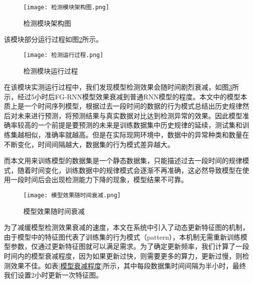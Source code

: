 \begin{figure}
  \centering
  \texttt{[image: 检测模块架构图.png]}
  \caption{检测模块架构图}
  \label{fig:检测模块架构图}
\end{figure}

  

该模块部分运行过程如图\ref{fig:检测模块运行过程}所示。

\begin{figure}
  \centering
  \texttt{[image: 检测运行过程.png]}
  \caption{检测模块运行过程}
  \label{fig:检测模块运行过程}
\end{figure}

在该模块实测运行过程中，我们发现模型检测效果会随时间剧烈衰减，如图\ref{fig:模型效果随时间衰减}所示，经过5小时后FG-RNN模型效果衰减到普通RNN模型的程度。本文中的模型本质上是一个时间序列模型，根据过去一段时间的数据的行为模式总结出历史规律然后对未来进行预测，将预测结果与真实数据对比达到检测异常的效果。因此模型准确率较高的一个前提是要预测的未来是训练数据集中历史规律的延续，测试集和训练集越相似，准确率就越高。但是在实际现网环境中，数据中的异常种类和数量在不断变化，时间间隔越大，数据集的行为模式差异越大。


而本文用来训练模型的数据集是一个静态数据集，只能描述过去一段时间的规律模式，随着时间变化，训练数据中的规律模式会逐渐不再准确，这必然导致模型在使用一段时间后会出现检测能力下降的现象，模型结果不可靠。

\begin{figure}
  \centering
  \texttt{[image: 模型效果随时间衰减.png]}
  \caption{模型效果随时间衰减}
  \label{fig:模型效果随时间衰减}
\end{figure}

为了减缓模型检测效果衰减的速度，本文在系统中引入了动态更新特征图的机制，由于模型中的特征图代表了训练集的行为模式（pattern），本机制无需重新训练模型参数，仅通过更新特征图就可以满足需求。为了确定更新频率，我们计算了一段时间内的模型衰减程度，因为如果更新过快，则需要更多的算力，更新过慢，则检测效果不佳。如表\ref{模型衰减程度}所示，其中每段数据集时间间隔为半小时，最终我们设置2小时更新一次特征图。

